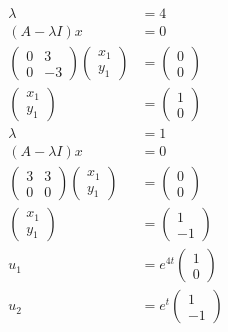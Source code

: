 \documentclass[main.tex]{subfiles}
\begin{document}
\begin{enumerate}
    $$
    \begin{aligned}
    \lambda & = 4\\
    (A-\lambda I) x&=0\\
    \left(\begin{array}{cc}
    0 & 3 \\
    0 & -3
    \end{array}\right)\left(\begin{array}{l}
    x_{1} \\
    y_{1}
    \end{array}\right) &=\left(\begin{array}{l}
    0 \\
    0
    \end{array}\right) \\
    \left(\begin{array}{l}
    x_{1} \\
    y_{1}
    \end{array}\right) &=\left(\begin{array}{l}
    1 \\
    0
    \end{array}\right)\\
    \lambda & = 1\\
    (A-\lambda I) x&=0\\
    \left(\begin{array}{ll}
    3 & 3 \\
    0 & 0
    \end{array}\right)\left(\begin{array}{l}
    x_{1} \\
    y_{1}
    \end{array}\right) &=\left(\begin{array}{l}
    0 \\
    0
    \end{array}\right) \\
    \left(\begin{array}{l}
    x_{1} \\
    y_{1}
    \end{array}\right) &=\left(\begin{array}{l}
    1 \\
    -1
    \end{array}\right)\\
    u_{1}&=e^{4 t}\left(\begin{array}{l}
    1 \\
    0
    \end{array}\right) \\
    u_{2}&=e^{t}\left(\begin{array}{l}
    1 \\
    -1
    \end{array}\right)
    \end{aligned}
    $$


\end{enumerate}
\end{document}
